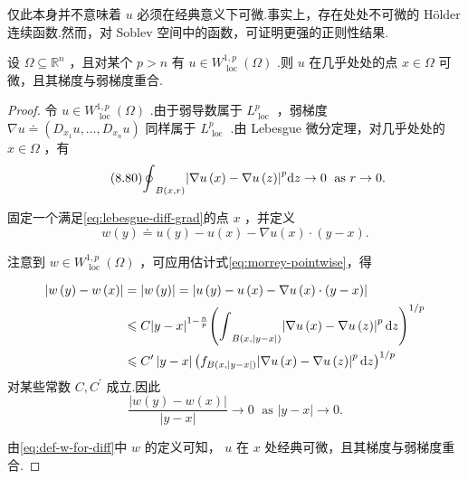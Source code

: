 仅此本身并不意味着 $u$ 必须在经典意义下可微.事实上，存在处处不可微的 Hölder 连续函数.然而，对 Soblev 空间中的函数，可证明更强的正则性结果.

\begin{theorem}[几乎处处可微性]\label{thm:a-e-differentiability}
设 $\Omega  \subseteq  {\mathbb{R}}^{n}$ ，且对某个 $p > n$ 有 $u \in  {W}_{\text{ loc }}^{1,p}\left( \Omega \right)$ .则 $u$ 在几乎处处的点 $x \in  \Omega$ 可微，且其梯度与弱梯度重合.
\end{theorem}

\begin{proof}
令 $u \in  {W}_{\text{ loc }}^{1,p}\left( \Omega \right)$ .由于弱导数属于 ${L}_{\text{ loc }}^{p}$ ，弱梯度 $\nabla u \doteq  \left( {{D}_{{x}_{1}}u,\ldots ,{D}_{{x}_{n}}u}\right)$ 同样属于 ${L}_{\text{ loc }}^{p}$ .由 Lebesgue 微分定理，对几乎处处的 $x \in  \Omega$ ，有
\begin{equation}\tag{8.80}\label{eq:lebesgue-diff-grad}
{\oint }_{B\left( {x,r}\right) }{\left| \nabla u\left( x\right)  - \nabla u\left( z\right) \right| }^{p}{\mathop{}\!\mathrm{d} z} \rightarrow  0\;\text{ as }r \rightarrow  0.
\end{equation}

固定一个满足\eqref{eq:lebesgue-diff-grad}的点 $x$ ，并定义
\begin{equation}\tag{8.81}\label{eq:def-w-for-diff}
w\left( y\right)  \doteq  u\left( y\right)  - u\left( x\right)  - \nabla u\left( x\right)  \cdot  \left( {y - x}\right) .
\end{equation}

注意到 $w \in  {W}_{\text{ loc }}^{1,p}\left( \Omega \right)$ ，可应用估计式\eqref{eq:morrey-pointwise}，得

{\begin{align*}
    \left| {w\left( y\right)  - w\left( x\right) }\right|  &= \left| {w\left( y\right) }\right|  = \left| {u\left( y\right)  - u\left( x\right)  - \nabla u\left( x\right)  \cdot  \left( {y - x}\right) }\right|\\
    &\leqslant  C{\left| y - x\right| }^{1 - \frac{n}{p}}{\left( {\int }_{B\left( {x,\left| {y - x}\right| }\right) }{\left| \nabla u\left( x\right)  - \nabla u\left( z\right) \right| }^{p}\mathop{}\!\mathrm{d} z\right) }^{1/p}\\
    &\leqslant  {C}^{\prime }\left| {y - x}\right| {\left( {f}_{B\left( {x,\left| {y - x}\right| }\right) }{\left| \nabla u\left( x\right)  - \nabla u\left( z\right) \right| }^{p}\mathop{}\!\mathrm{d} z\right) }^{1/p}
\end{align*}}
对某些常数 $C,{C}^{\prime }$ 成立.因此
\[
\frac{\left| w\left( y\right)  - w\left( x\right) \right| }{\left| y - x\right| } \rightarrow  0\;\text{ as }\left| {y - x}\right|  \rightarrow  0.
\]

由\eqref{eq:def-w-for-diff}中 $w$ 的定义可知， $u$ 在 $x$ 处经典可微，且其梯度与弱梯度重合.
\end{proof}

